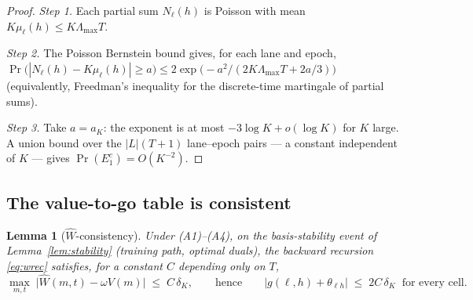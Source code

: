 \documentclass[11pt]{article}
\newtheorem{lemma}{Lemma}
\begin{document}
\begin{proof}
\emph{Step 1.} Each partial sum $N_{\ell}(h)$ is Poisson with mean
$K \mu_{\ell}(h) \leq K \Lambda_{\max} T$.

\emph{Step 2.} The Poisson Bernstein bound gives, for each lane and
epoch,
$\Pr\bigl( |N_{\ell}(h) - K\mu_{\ell}(h)| \geq a \bigr)
\leq 2 \exp\bigl( -a^2 / (2 K \Lambda_{\max} T + 2a/3) \bigr)$
(equivalently, Freedman's inequality \citep{freedman1975tail} for the
discrete-time martingale of partial sums).

\emph{Step 3.} Take $a = a_K$: the exponent is at most
$-3 \log K + o(\log K)$ for $K$ large. A union bound over the
$|L| (T + 1)$ lane--epoch pairs --- a constant independent of $K$ ---
gives $\Pr(E_1^c) = O(K^{-2})$.
\end{proof}

\subsection{The value-to-go table is consistent}

\begin{lemma}[$\widehat{W}$-consistency]
\label{lem:wcons}
Under (A1)--(A4), on the basis-stability event of
Lemma~\ref{lem:stability} (training path, optimal duals), the backward
recursion \eqref{eq:wrec} satisfies, for a constant $C$ depending only
on $T$,
\begin{equation}
  \max_{m, t}\; \bigl| \widehat{W}(m, t) - \omega V(m) \bigr|
  \;\leq\; C\,\delta_K,
  \qquad\text{hence}\qquad
  \bigl| g(\ell, h) + \theta_{\ell h} \bigr| \;\leq\; 2 C\,\delta_K
  \;\;\text{for every cell.}
\end{equation}
\end{lemma}
\end{document}
